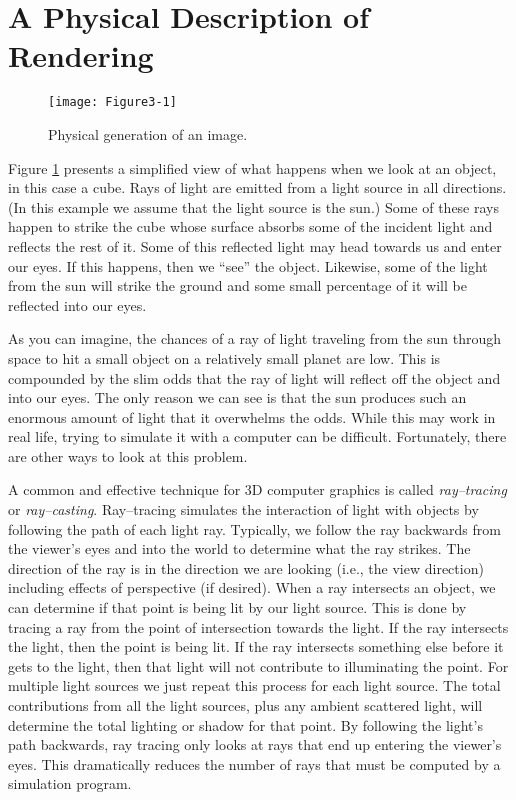 \section{A Physical Description of Rendering}

\begin{figure}[ht]
  \centering
  \texttt{[image: Figure3-1]}\\
  \caption{Physical generation of an image.}\label{fig:Figure3-1}
\end{figure}

Figure \ref{fig:Figure3-1} presents a simplified view of what happens when we look at an object, in this case a cube. Rays of light are emitted from a light source in all directions. (In this example we assume that the light source is the sun.) Some of these rays happen to strike the cube whose surface absorbs some of the incident light and reflects the rest of it. Some of this reflected light may head towards us and enter our eyes. If this happens, then we ``see'' the object. Likewise, some of the light from the sun will strike the ground and some small percentage of it will be reflected into our eyes.

As you can imagine, the chances of a ray of light traveling from the sun through space to hit a small object on a relatively small planet are low. This is compounded by the slim odds that the ray of light will reflect off the object and into our eyes. The only reason we can see is that the sun produces such an enormous amount of light that it overwhelms the odds. While this may work in real life, trying to simulate it with a computer can be difficult. Fortunately, there are other ways to look at this problem.

A common and effective technique for 3D computer graphics is called \emph{ray--tracing} or \emph{ray--casting}. Ray--tracing simulates the interaction of light with objects by following the path of each light ray. Typically, we follow the ray backwards from the viewer's eyes and into the world to determine what the ray strikes. The direction of the ray is in the direction we are looking (i.e., the view direction) including effects of perspective (if desired). When a ray intersects an object, we can determine if that point is being lit by our light source. This is done by tracing a ray from the point of intersection towards the light. If the ray intersects the light, then the point is being lit. If the ray intersects something else before it gets to the light, then that light will not contribute to illuminating the point. For multiple light sources we just repeat this process for each light source. The total contributions from all the light sources, plus any ambient scattered light, will determine the total lighting or shadow for that point. By following the light's path backwards, ray tracing only looks at rays that end up entering the viewer's eyes. This dramatically reduces the number of rays that must be computed by a simulation program.

